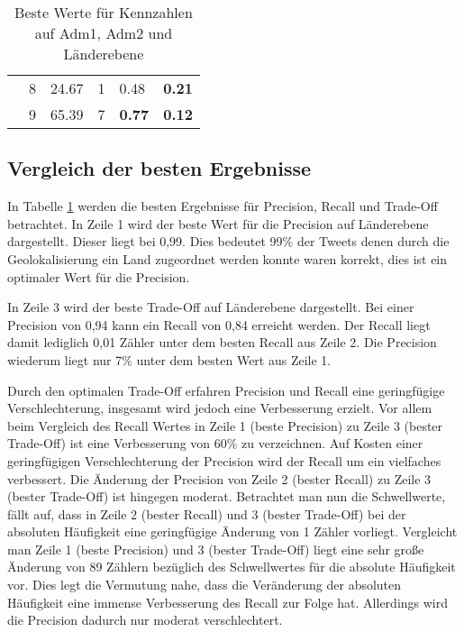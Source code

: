 \begin{table}[h]
\begin{tabular}{|l|l|l|l|l|l|}
			                      & 8 & 24.67                                                                      & 1                                                                         & 0.48          & \textbf{0.21} \\ \cline{2-6} 
			                      & 9 & 65.39                                                                      & 7                                                                         & \textbf{0.77} & \textbf{0.12} \\ \hline
			\end{tabular}
			\caption{Beste Werte für Kennzahlen auf Adm1, Adm2 und Länderebene}
			\label{tab:optAdm1Adm2Co}
			\end{table}

			


		
		\subsection{Vergleich der besten Ergebnisse}

			In Tabelle \ref{tab:optAdm1Adm2Co} werden die besten Ergebnisse für Precision, Recall und Trade-Off betrachtet.
			In Zeile 1 wird der beste Wert für die Precision auf Länderebene dargestellt. 
			Dieser liegt bei 0,99. 
			Dies bedeutet 99\% der Tweets denen durch die Geolokalisierung ein Land zugeordnet werden konnte waren korrekt, dies ist ein optimaler Wert für die Precision.
			
			In Zeile 3 wird der beste Trade-Off auf Länderebene dargestellt.
			Bei einer Precision von 0,94 kann ein Recall von 0,84 erreicht werden. 
			Der Recall liegt damit lediglich 0,01 Zähler unter dem besten Recall aus Zeile 2.
			Die Precision wiederum liegt nur 7\% unter dem besten Wert aus Zeile 1. 
			
			Durch den optimalen Trade-Off erfahren Precision und Recall eine geringfügige Verschlechterung, insgesamt wird jedoch eine Verbesserung erzielt.
			Vor allem beim Vergleich des Recall Wertes in Zeile 1 (beste Precision) zu Zeile 3 (bester Trade-Off) ist eine Verbesserung von 60\% zu verzeichnen.
			Auf Kosten einer geringfügigen Verschlechterung der Precision wird der Recall um ein vielfaches verbessert.
			Die Änderung der Precision von Zeile 2 (bester Recall) zu Zeile 3 (bester Trade-Off) ist hingegen moderat. 
			Betrachtet man nun die Schwellwerte, fällt auf, dass in Zeile 2 (bester Recall) und 3 (bester Trade-Off) bei der absoluten Häufigkeit eine geringfügige Änderung von 1 Zähler vorliegt.
			Vergleicht man Zeile 1 (beste Precision) und 3 (bester Trade-Off) liegt eine sehr große Änderung von 89 Zählern bezüglich des Schwellwertes für die absolute Häufigkeit vor. 
			Dies legt die Vermutung nahe, dass die Veränderung der absoluten Häufigkeit eine immense Verbesserung des Recall zur Folge hat.
			Allerdings wird die Precision dadurch nur moderat verschlechtert. 

